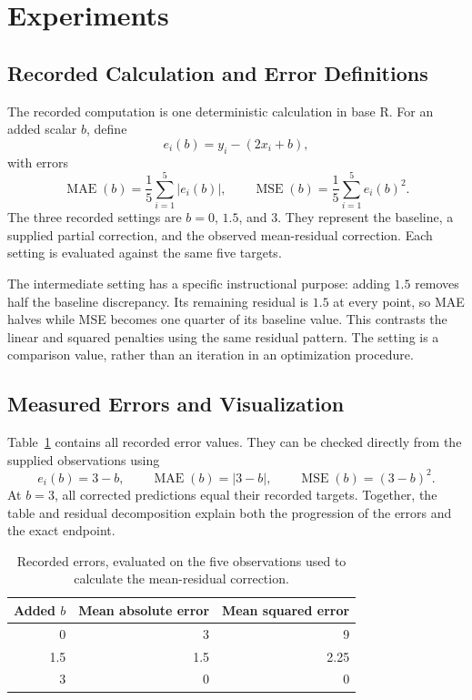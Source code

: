 \documentclass[11pt]{article}
\begin{document}
\section{Experiments}

\subsection{Recorded Calculation and Error Definitions}

The recorded computation is one deterministic calculation in base R. For an added scalar $b$, define
\[
e_i(b)=y_i-(2x_i+b),
\]
with errors
\[
\operatorname{MAE}(b)=\frac{1}{5}\sum_{i=1}^{5}|e_i(b)|,
\qquad
\operatorname{MSE}(b)=\frac{1}{5}\sum_{i=1}^{5}e_i(b)^2.
\]
The three recorded settings are $b=0$, $1.5$, and $3$. They represent the baseline, a supplied partial correction, and the observed mean-residual correction. Each setting is evaluated against the same five targets.

The intermediate setting has a specific instructional purpose: adding $1.5$ removes half the baseline discrepancy. Its remaining residual is $1.5$ at every point, so MAE halves while MSE becomes one quarter of its baseline value. This contrasts the linear and squared penalties using the same residual pattern. The setting is a comparison value, rather than an iteration in an optimization procedure.

\subsection{Measured Errors and Visualization}

Table~\ref{tab:recorded_errors} contains all recorded error values. They can be checked directly from the supplied observations using
\[
e_i(b)=3-b,\qquad
\operatorname{MAE}(b)=|3-b|,\qquad
\operatorname{MSE}(b)=(3-b)^2.
\]
At $b=3$, all corrected predictions equal their recorded targets. Together, the table and residual decomposition explain both the progression of the errors and the exact endpoint.

\begin{table}[!htbp]
\centering
\caption{Recorded errors, evaluated on the five observations used to calculate the mean-residual correction.}
\label{tab:recorded_errors}
\begin{tabular}{rrr}
\toprule
Added $b$ & Mean absolute error & Mean squared error \\
\midrule
0   & 3   & 9    \\
1.5 & 1.5 & 2.25 \\
3   & 0   & 0    \\
\bottomrule
\end{tabular}
\end{table}
\end{document}

